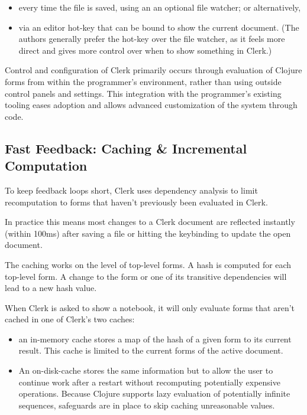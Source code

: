 \documentclass[sigconf,screen]{acmart}
\providecommand{\tightlist}{%
  \setlength{\itemsep}{0pt}\setlength{\parskip}{0pt}}
\begin{document}
\begin{itemize}
\tightlist
\item
  every time the file is saved, using an an optional file watcher; or alternatively,
\item
  via an editor hot-key that can be bound to show the current document. (The authors generally prefer the hot-key over the file watcher, as it feels more direct and gives more control over when to show something in Clerk.)
\end{itemize}

Control and configuration of Clerk primarily occurs through evaluation of Clojure forms from within the programmer's environment, rather than using outside control panels and settings. This integration with the programmer's existing tooling eases adoption and allows advanced customization of the system through code.

\hypertarget{id}{%
\subsection{Fast Feedback: Caching \& Incremental Computation}\label{id}}

To keep feedback loops short, Clerk uses dependency analysis to limit recomputation to forms that haven't previously been evaluated in Clerk.

In practice this means most changes to a Clerk document are reflected instantly (within 100ms) after saving a file or hitting the keybinding to update the open document.

The caching works on the level of top-level forms. A hash is computed for each top-level form. A change to the form or one of its transitive dependencies will lead to a new hash value.

When Clerk is asked to show a notebook, it will only evaluate forms that aren't cached in one of Clerk's two caches:

\begin{itemize}
\tightlist
\item
  an in-memory cache stores a map of the hash of a given form to its current result. This cache is limited to the current forms of the active document.
\item
  An on-disk-cache stores the same information but to allow the user to continue work after a restart without recomputing potentially expensive operations. Because Clojure supports lazy evaluation of potentially infinite sequences, safeguards are in place to skip caching unreasonable values.
\end{itemize}
\end{document}

